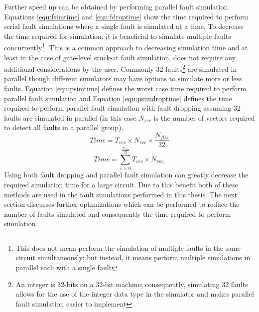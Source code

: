 \documentclass[12pt]{report}
\begin{document}
Further speed up can be obtained by performing parallel fault simulation.  Equations \ref{equ:fsimtime} and \ref{equ:fdroptime} show the time required to perform serial fault simulations where a single fault is simulated at a time.  To decrease the time required for simulation, it is beneficial to simulate multiple faults concurrently\footnote{This does not mean perform the simulation of multiple faults in the same circuit simultaneously; but instead, it means perform multiple simulations in parallel each with a single fault\cite{parallelflts}}. This is a common approach to decreasing simulation time and at least in the case of gate-level stuck-at fault simulation, does not require any additional considerations by the user\cite{parallelflts}.  Commonly 32 faults\footnote{An integer is 32-bits on a 32-bit machine; consequently, simulating 32 faults allows for the use of the integer data type in the simulator and makes parallel fault simulation easier to implement\cite{parallelflts}} are simulated in parallel though different simulators may have options to simulate more or less faults\cite{parallelflts}.  Equation \ref{equ:psimtime} defines the worst case time required to perform parallel fault simulation and Equation \ref{equ:psimdroptime} defines the time required to perform parallel fault simulation with fault dropping assuming 32 faults are simulated in parallel (in this case $N_{vec}$ is the number of vectors required to detect all faults in a parallel group). 
\begin{equation}
Time = T_{vec} \times N_{vec} \times \frac{N_{flts}}{32}
\label{equ:psimtime}
\end{equation}
\begin{equation}
Time =  \sum_{i=0}^{\frac{N_{flts}}{32}} T_{vec} \times N_{vec_i}
\label{equ:psimdroptime}
\end{equation}
Using both fault dropping and parallel fault simulation can greatly decrease the required simulation time for a large circuit.  Due to this benefit both of these methods are used in the fault simulations performed in this thesis.  The next section discusses further optimizations which can be performed to reduce the number of faults simulated and consequently the time required to perform simulation.
\end{document}
